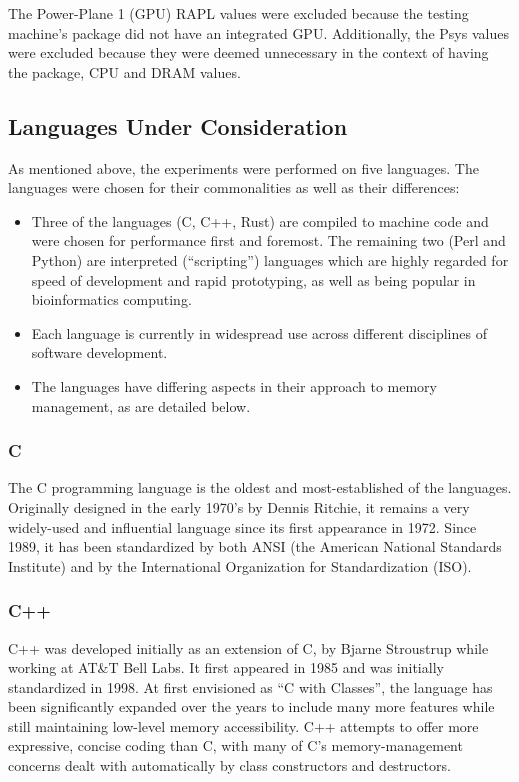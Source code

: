 The Power-Plane 1 (GPU) RAPL values were excluded because the testing machine's package did not have an integrated GPU. Additionally, the Psys values were excluded because they were deemed unnecessary in the context of having the package, CPU and DRAM values.

\subsection{Languages Under Consideration}

As mentioned above, the experiments were performed on five languages. The languages were chosen for their commonalities as well as their differences:

\begin{itemize}
\item Three of the languages (C, C++, Rust) are compiled to machine code and were chosen for performance first and foremost. The remaining two (Perl and Python) are interpreted (``scripting'') languages which are highly regarded for speed of development and rapid prototyping, as well as being popular in bioinformatics computing.
\item Each language is currently in widespread use across different disciplines of software development.
\item The languages have differing aspects in their approach to memory management, as are detailed below.
\end{itemize}

\subsubsection{C}

The C programming language is the oldest and most-established of the languages. Originally designed in the early 1970's by Dennis Ritchie, it remains a very widely-used and influential language since its first appearance in 1972. Since 1989, it has been standardized by both ANSI (the American National Standards Institute) and by the International Organization for Standardization (ISO).

\subsubsection{C++}

C++ was developed initially as an extension of C, by Bjarne Stroustrup while working at AT\&T Bell Labs. It first appeared in 1985 and was initially standardized in 1998. At first envisioned as ``C with Classes'', the language has been significantly expanded over the years to include many more features while still maintaining low-level memory accessibility. C++ attempts to offer more expressive, concise coding than C, with many of C's memory-management concerns dealt with automatically by class constructors and destructors.

